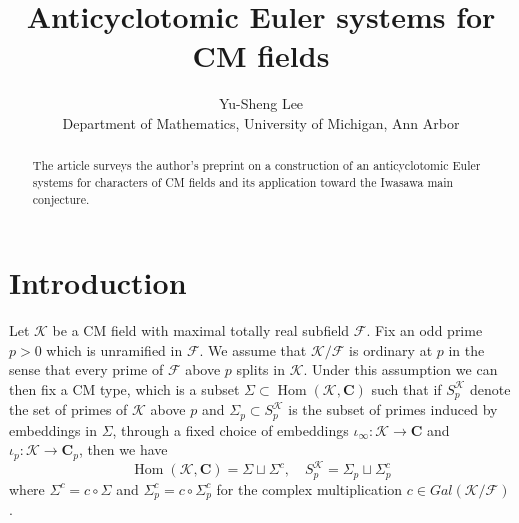 \documentclass[leqno]{amsart}
\theoremstyle{definition}
\theoremstyle{remark}
\newcommand{\C}{\mathbf C}
\DeclareMathOperator{\Hom}{Hom}
\newcommand{\F}{{\mathcal{F}}} %
\newcommand{\K}{{\mathcal{K}}} %
\begin{document}
\title{Anticyclotomic Euler systems for CM fields}
\author[Y-S.~Lee]{Yu-Sheng Lee\\
Department of Mathematics, University  of Michigan, Ann Arbor}
\address{Department of Mathematics, University  of Michigan, Ann Arbor, MI 48109, USA}
\date{}

\begin{abstract}
    The article surveys the author's preprint \cite{lee2} on
    a construction of an anticyclotomic Euler systems
    for characters of CM fields and its application 
    toward the Iwasawa main conjecture.
\end{abstract}

\maketitle
\setcounter{tocdepth}{1}

\section*{Introduction}

Let $\K$ be a CM field with maximal totally real subfield $\F$.
Fix an odd prime $p>0$ which is unramified in $\F$.
We assume that $\K/\F$ is ordinary at $p$ in the sense that
every prime of $\F$ above $p$ splits in $\K$.
Under this assumption we can then fix a CM type,
which is a subset $\Sigma\subset \Hom(\K,\C)$
such that if $S_p^\K$ denote the set of primes of $\K$ above $p$
and $\Sigma_p\subset S_p^\K$ is the subset of primes
induced by embeddings in $\Sigma$,
through a fixed choice of embeddings
$\iota_\infty\colon \K\to \C$ and
$\iota_p\colon \K\to \C_p$, then we have
\[
    \Hom(\K,\C)=\Sigma\sqcup \Sigma^c,\quad
    S_p^\K=\Sigma_p\sqcup \Sigma_p^c
\]
where $\Sigma^c=c\circ \Sigma$ and $\Sigma_p^c=c\circ \Sigma_p^c$
for the complex multiplication $c\in Gal(\K/\F)$.
\end{document}
